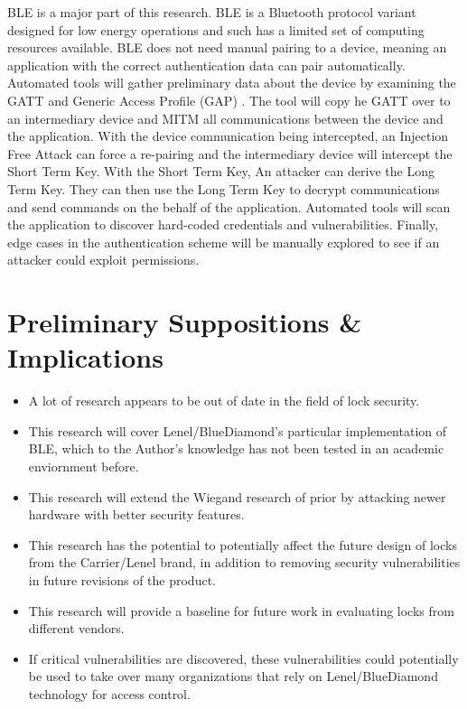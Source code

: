 \documentclass[10pt,twocolumn,letterpaper]{article}
\begin{document}
BLE is a major part of this research. BLE is a Bluetooth protocol variant designed for low energy operations and such has a limited set of computing resources available. BLE does not need manual pairing to a device, meaning an application with the correct authentication data can pair automatically. Automated tools will gather preliminary data about the device by examining the GATT and Generic Access Profile (GAP) . The tool will copy he GATT over to an intermediary device and MITM all communications between the device and the application. With the device communication being intercepted, an Injection Free Attack can force a re-pairing and the intermediary device will intercept the Short Term Key. With the Short Term Key,  An attacker can derive the Long Term Key. They can then use the Long Term Key to decrypt communications and send commands on the behalf of the application. Automated tools will scan the application to discover hard-coded credentials and vulnerabilities. Finally, edge cases in the authentication scheme will be manually explored to see if an attacker could exploit permissions.


\section{Preliminary Suppositions \& Implications}
\begin{itemize}
    \item A lot of research appears to be out of date in the field of lock security.
    \item This research will cover Lenel/BlueDiamond's particular implementation of BLE, which to the Author's knowledge has not been tested in an academic enviornment before.
    \item This research will extend the Wiegand research of prior by attacking newer hardware with better security features.
    \item This research has the potential to potentially affect the future design of locks from the Carrier/Lenel brand, in addition to removing security vulnerabilities in future revisions of the product.
    \item This research will provide a baseline for future work in evaluating locks from different vendors.
    \item If critical vulnerabilities are discovered, these vulnerabilities could potentially be used to take over many organizations that rely on Lenel/BlueDiamond technology for access control. 
\end{itemize}
 
\end{document}
